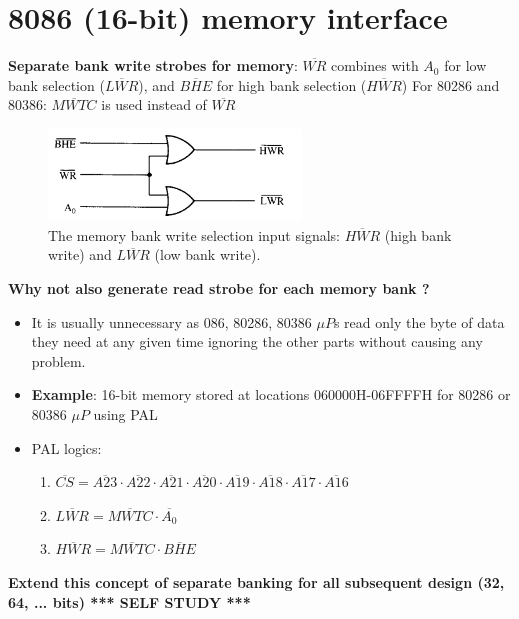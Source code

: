 \newpage
\section{8086 (16-bit) memory interface}
\textbf{Separate bank write strobes for memory}: $\overline{WR}$ combines with $A_0$ for low bank selection ($\overline{LWR}$), and $\overline{BHE}$ for high bank selection ($\overline{HWR}$)
\newline
For 80286 and 80386: $\overline{MWTC}$ is used instead of $\overline{WR}$
\begin{figure}[h!]
  \includegraphics[width = 0.6\textwidth]{./figures/Bank_8086.png}
  \caption{The memory bank write selection input signals: $\overline{HWR}$ (high bank write) and $\overline{LWR}$ (low bank write).}
  \label{}
\end{figure}
\newline
\textbf{Why not also generate read strobe for each memory bank ?}\newline
\begin{itemize}
  \item It is usually unnecessary as 086, 80286, 80386 $\mu P$s read only the byte of data they need at any given time ignoring the other parts without causing any problem.
  \item \textbf{Example}: 16-bit memory stored at locations 060000H-06FFFFH for 80286 or 80386 $\mu P$ using PAL
  \item PAL logics:
  \begin{enumerate}
    \item $\overline{CS} = \overline{A23} \cdot \overline{A22} \cdot \overline{A21} \cdot \overline{A20} \cdot \overline{A19} \cdot \overline{A18} \cdot \overline{A17} \cdot \overline{A16}$
    \item $\overline{LWR} = \overline{MWTC} \cdot \overline{A_0}$
    \item $\overline{HWR} = \overline{MWTC} \cdot \overline{BHE}$
  \end{enumerate}
\end{itemize}
\textbf{Extend this concept of separate banking for all subsequent design (32, 64, ... bits) *** SELF STUDY ***}
\newpage

